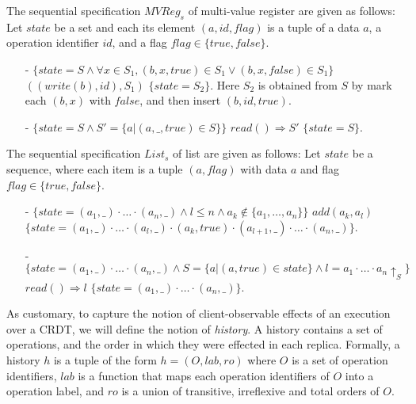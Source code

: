 \begin{example}
\label{definition:sequential specification of multi-value register}
The sequential specification $\mathit{MVReg}_s$ of multi-value register are given as follows: Let $state$ be a set and each its element $(a,id,flag)$ is a tuple of a data $a$, a operation identifier $id$, and a flag $flag \in \{ \mathit{true},\mathit{false} \}$.
\begin{itemize}
\setlength{\itemsep}{0.5pt}
\item[-] $\{ state = S \wedge \forall x \in S_1, (b,x,\mathit{true}) \in S_1 \vee (b,x,\mathit{false}) \in S_1 \}$ $((write(b),id),S_1)$ $\{ state = S_2 \}$. Here $S_2$ is obtained from $S$ by mark each $(b,x)$ with $\mathit{false}$, and then insert $(b,id,\mathit{true})$.
\item[-] $\{ state = S \wedge S' = \{ a \vert (a,\_,\mathit{true}) \in S \} \}$ $read() \Rightarrow S'$ $\{ state = S \}$.
\end{itemize}
\end{example}


\begin{example}
\label{definition:sequential specification of list with add-after interface}
The sequential specification $\mathit{List}_s$ of list are given as follows: Let $state$ be a sequence, where each item is a tuple $(a,flag)$ with data $a$ and flag $flag \in \{ \mathit{true},\mathit{false} \}$.
\begin{itemize}
\setlength{\itemsep}{0.5pt}
\item[-] $\{ state = (a_1,\_) \cdot \ldots \cdot (a_n,\_) \wedge l \leq n \wedge a_k \notin \{ a_1, \ldots, a_n \} \}$ $add(a_k,a_l)$ $\{ state = (a_1,\_) \cdot \ldots \cdot (a_l,\_) \cdot (a_k,\mathit{true}) \cdot (a_{l+1},\_) \cdot \ldots \cdot (a_n,\_) \}$.
\item[-] $\{ state = (a_1,\_) \cdot \ldots \cdot (a_n,\_) \wedge S = \{ a \vert (a,\mathit{true}) \in state \} \wedge l = a_1 \cdot \ldots \cdot a_n \uparrow_{S} \}$ $read() \Rightarrow l$ $\{ state = (a_1,\_) \cdot \ldots \cdot (a_n,\_) \}$.
\end{itemize}
\end{example}



As customary, to capture the notion of client-observable effects of an execution over a CRDT, we will define the notion of \emph{history}. A history contains a set of operations, and the order in which they were effected in each replica. Formally, a history $h$ is a tuple of the form $h = (O,\mathit{lab},\mathit{ro})$ where $O$ is a set of operation identifiers, $\mathit{lab}$ is a function that maps each operation identifiers of $O$ into a operation label, and $\mathit{ro}$ is a union of transitive, irreflexive and total orders of $O$.

